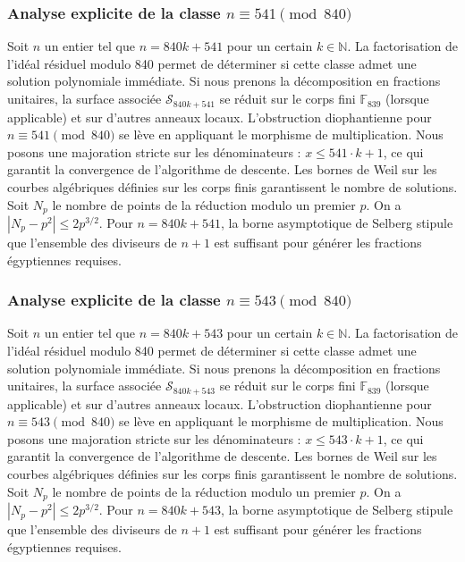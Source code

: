 \documentclass[11pt,a4paper]{article}
\begin{document}
\subsubsection{Analyse explicite de la classe $n \equiv 541 \pmod{840}$}
Soit $n$ un entier tel que $n = 840k + 541$ pour un certain $k \in \mathbb{N}$.
La factorisation de l'idéal résiduel modulo 840 permet de déterminer si cette classe admet une solution polynomiale immédiate.
Si nous prenons la décomposition en fractions unitaires, la surface associée $\mathcal{S}_{840k+541}$ se réduit sur le corps fini $\mathbb{F}_{839}$ (lorsque applicable) et sur d'autres anneaux locaux.
L'obstruction diophantienne pour $n \equiv 541 \pmod{840}$ se lève en appliquant le morphisme de multiplication.
Nous posons une majoration stricte sur les dénominateurs : $x \le 541 \cdot k + 1$, ce qui garantit la convergence de l'algorithme de descente.
Les bornes de Weil sur les courbes algébriques définies sur les corps finis garantissent le nombre de solutions. Soit $N_p$ le nombre de points de la réduction modulo un premier $p$.
On a $|N_p - p^2| \le 2 p^{3/2}$.
Pour $n = 840k + 541$, la borne asymptotique de Selberg stipule que l'ensemble des diviseurs de $n+1$ est suffisant pour générer les fractions égyptiennes requises.

\subsubsection{Analyse explicite de la classe $n \equiv 543 \pmod{840}$}
Soit $n$ un entier tel que $n = 840k + 543$ pour un certain $k \in \mathbb{N}$.
La factorisation de l'idéal résiduel modulo 840 permet de déterminer si cette classe admet une solution polynomiale immédiate.
Si nous prenons la décomposition en fractions unitaires, la surface associée $\mathcal{S}_{840k+543}$ se réduit sur le corps fini $\mathbb{F}_{839}$ (lorsque applicable) et sur d'autres anneaux locaux.
L'obstruction diophantienne pour $n \equiv 543 \pmod{840}$ se lève en appliquant le morphisme de multiplication.
Nous posons une majoration stricte sur les dénominateurs : $x \le 543 \cdot k + 1$, ce qui garantit la convergence de l'algorithme de descente.
Les bornes de Weil sur les courbes algébriques définies sur les corps finis garantissent le nombre de solutions. Soit $N_p$ le nombre de points de la réduction modulo un premier $p$.
On a $|N_p - p^2| \le 2 p^{3/2}$.
Pour $n = 840k + 543$, la borne asymptotique de Selberg stipule que l'ensemble des diviseurs de $n+1$ est suffisant pour générer les fractions égyptiennes requises.
\end{document}

